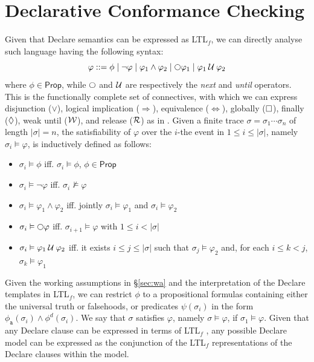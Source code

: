 \section{Declarative Conformance Checking}\label{sec:dccap}
Given that Declare semantics can be expressed as LTL$_f$, we can directly analyse such language having the following syntax:
\[\varphi::=\phi\;|\;\neg \varphi\;|\;\varphi_1\wedge\varphi_2\;|\;\Next \varphi_1\;|\;\varphi_1\Until\varphi_2\]
where $\phi\in \mathsf{Prop}$, while $\Next$ and $\mathbin{\mathcal{U}}$ are respectively the \textit{next} and \textit{until} operators. This is the functionally complete set of connectives, with which we can express  disjunction ($\vee$),  logical implication ($\Rightarrow$),  equivalence ($\Leftrightarrow$), globally ($\square$), finally ($\lozenge$), weak until ($\mathbin{\mathcal{W}}$), and release ($\mathbin{\mathcal{R}}$) as in \cite{XuLZ17a}. Given a finite trace $\sigma=\sigma_1\cdots \sigma_n$ of length $|\sigma|=n$, the satisfiability of $\varphi$ over the $i$-the event in $1\leq i\leq |\sigma|$, namely $\sigma_i\vDash \varphi$, is inductively defined as follows:
\begin{itemize}
	\item $\sigma_i\vDash\phi$ iff. $\sigma_i\vDash\phi$, $\phi\in \mathsf{Prop}$
	\item $\sigma_i\vDash\neg\varphi$ iff. $\sigma_i\not\vDash\varphi$
	\item $\sigma_i\vDash\varphi_1\wedge\varphi_2$ iff. jointly $\sigma_i\vDash\varphi_1$ and $\sigma_i\vDash\varphi_2$
	\item $\sigma_i\vDash\Next\varphi$ iff. $\sigma_{i+1}\vDash\varphi$ with $1\leq i< |\sigma|$
	\item $\sigma_i\vDash\varphi_1\mathbin{\mathcal{U}}\varphi_2$ iff. it exists $i\leq j\leq |\sigma|$ such that $\sigma_j\vDash\varphi_2$ and, for each $i\leq k<j$, $\sigma_k\vDash\varphi_1$
\end{itemize}
Given the working assumptions in \S\ref{sec:wa} and the interpretation of the Declare templates in LTL$_f$, we can restrict $\phi$ to a propositional formulas containing either the universal truth or falsehoods, or predicates $\psi(\sigma_i)$ in the form $\phi_{\texttt{a}}(\sigma_i)\wedge \phi^d(\sigma_i)$.  We say that $\sigma$ satisfies $\varphi$, namely $\sigma\vDash\varphi$, if $\sigma_1\vDash\varphi$. Given that any  Declare clause can be expressed in terms of LTL$_f$ \cite{10.1007/978-3-642-40176-3_8}, any possible  Declare model can be expressed as the conjunction of the LTL$_f$ representations of the  Declare clauses within the model. 


